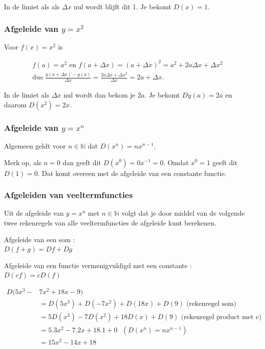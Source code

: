 \noindent In de limiet als als $\Delta x$ nul wordt blijft dit 1.
Je bekomt $D(x)=1$.

\subsubsection{Afgeleide van $y=x^2$}

Voor $f(x)=x^2$ is

\begin{eqnarray*}
f(a)=a^2 \text{ en } f(a+\Delta x)=(a+\Delta x)^2=a^2+2a\Delta x + \Delta x^2 \\
\text{dus }
\frac{y(a+\Delta x)-y(a)}{\Delta x}=\frac{2a \Delta x +\Delta x^2}{\Delta x}=2a+ \Delta x.
\end{eqnarray*}

In de limiet als $\Delta x$ nul wordt dan bekom je $2a$.
Je bekomt $Dy(a)=2a$ en daarom $D(x^2)=2x$.

\subsubsection{Afgeleide van $y=x^n$}

Algemeen geldt voor $n\in \mathbb{N}$ dat $D(x^n)=nx^{n-1}$.

Merk op, als $n=0$ dan geeft dit $D(x^0)=0x^{-1}=0$.
Omdat $x^0=1$ geeft dit $D(1)=0$.
Dat komt overeen met de afgeleide van een constante functie.

\subsubsection{Afgeleiden van veeltermfuncties}

Uit de afgeleide van $y=x^n$ met $n\in \mathbb{N}$ volgt dat je door middel van de volgende twee rekenregels van alle veeltermfuncties de afgeleide kunt berekenen.

\begin{eigenschap} Afgeleide van een som : \\
	$\boxed { D(f+g)=Df+Dg}$
\end{eigenschap}

\begin{eigenschap} Afgeleide van een functie vermenigvuldigd met een constante :
	$\boxed { D(cf)=cD(f)}$
\end{eigenschap}

\begin{voorbeeld}
	\begin{equation*}
	\begin{split}
	D(5x^3-&7x^2+18x-9)\\
	&=D(5x^3)+D(-7x^2)+D(18x)+D(9) \text{ (rekenregel som)}\\
	&=5D(x^3)-7D(x^2)+18D(x)+D(9) \text{ (rekenregel product met c)}\\
	&=5.3x^2-7.2x+18.1+0 \text{ $(D(x^n)=nx^{n-1})$}\\
	&=15x^2-14x+18
	\end{split}
	\end{equation*}
\end{voorbeeld}

